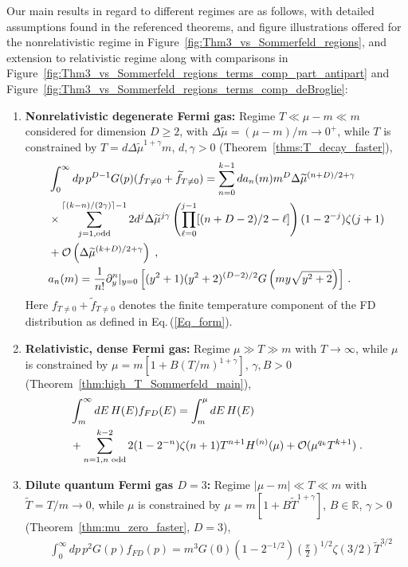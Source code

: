 \documentclass[sn-mathphys,Numbered]{sn-jnl}
\newcommand{\req}[1]{Eq.\,(\ref{#1})}
\newcommand{\rf}[1]{Figure~{\ref{#1}}}
\newcommand{\rTh}[1]{Theorem~{\ref{#1}}}
\begin{document}
 Our main results in regard to different regimes are as follows, with detailed assumptions found in the referenced theorems, and figure illustrations offered for the nonrelativistic regime in \rf{fig:Thm3_vs_Sommerfeld_regions},  and extension to relativistic regime along with comparisons in \rf{fig:Thm3_vs_Sommerfeld_regions_terms_comp_part_antipart} and \rf{fig:Thm3_vs_Sommerfeld_regions_terms_comp_deBroglie}:
\begin{enumerate}
\item 
{\bf Nonrelativistic degenerate Fermi gas:} Regime $T\ll\mu-m\ll m$ considered for dimension $D\geq 2$, with  $\Delta\widetilde{\mu}=(\mu-m)/m\to 0^+$, while $T$ is constrained by   $T=d\Delta\widetilde{\mu}^{1+\gamma}m$,  $d,\gamma>0$ (\rTh{thms:T_decay_faster}),
\begin{align}
 &\int_0^\infty dp\, p^{D-1} G(p)(f_{T\neq 0}+\widetilde{f}_{T\neq 0})=\sum_{n=0}^{k-1} da_n(m)m^{D}\Delta\widetilde{\mu}^{(n+D)/2+\gamma}\\
 &\times\sum_{j=1,\mathrm{odd}}^{\lceil(k-n)/(2\gamma)\rceil-1}
 2d^j\Delta\widetilde{\mu}^{j\gamma}\left(\prod_{\ell=0}^{j-1}[(n+D-2)/2-\ell] \right)(1-2^{-j})\zeta(j+1) \notag\\
 &+\mathcal{O}\left(\Delta\widetilde{\mu}^{(k+D)/2+\gamma}\right)\;,\notag\\
&a_n(m)=\frac{1}{n!}\partial_y^n|_{y=0}\left[ (y^2+1)( y^2+2)^{(D-2)/2} G\left(my\sqrt{y^2+2}\right)\right]\,.
\end{align}
Here $f_{T\neq 0}+\widetilde{f}_{T\neq 0}$ denotes the finite temperature component of the FD distribution as defined in \req{Eq_form}.
\item  
{\bf Relativistic, dense Fermi gas:} Regime $\mu\gg T\gg m$ with  $T\to\infty$, while $\mu$ is constrained by $\mu=m[1+B(T/m)^{1+\gamma}]$, $\gamma,B>0$ (\rTh{thm:high_T_Sommerfeld_main}),
\begin{align}
 &\int_m^\infty dE\, H(E)f_{FD}(E)=\int_m^\mu dE\, H(E)\\
&+\sum_{n=1,n\text{ odd}}^{k-2} 2(1-2^{-n})\zeta(n+1)T^{n+1}H^{(n)}(\mu)+\mathcal{O}(\mu^{q_k}T^{k+1})\;.\notag
\end{align} 
\item  
{\bf Dilute quantum  Fermi gas $D=3$:} Regime $|\mu-m|\ll T\ll m$ with $\widetilde T=T/m\to 0$, while $\mu$ is constrained by  $\mu=m[1+B\widetilde{T}^{1+\gamma}]$, $B\in\mathbb{R}$, $\gamma>0$ (\rTh{thm:mu_zero_faster}, $D=3$),
\begin{align}
&\int_0^\infty dp\, p^{2} G(p) f_{FD}(p) =m^{3}G(0)(1 - 2^{-1/2}) \left(\frac{\pi}{2}\right)^{1/2} \!\!\zeta(3/2)\widetilde{T}^{3/2}\label{eq:thm5_D3_conc}\\

\end{align}
\end{enumerate}
\end{document}
